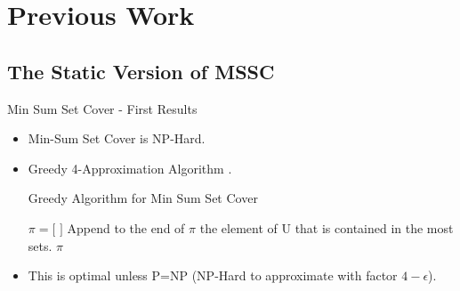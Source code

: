 \documentclass{beamer}
\begin{document}
\section{Previous Work}

\subsection{The Static Version of MSSC}

\begin{frame}{Min Sum Set Cover - First Results}
        \begin{itemize}
             \item Min-Sum Set Cover is NP-Hard.
             \item Greedy 4-Approximation Algorithm \cite{FLT02}.
                \begin{block}{Greedy Algorithm for Min Sum Set Cover}\label{alg:mssc}
                    \begin{algorithmic}[1]
                        \STATE $\pi = \text{[ ]}$
                            \STATE Append to the end of $\pi$ the element of U that is contained in the most sets.
                        \ENDWHILE
                        \RETURN $\pi$
                    \end{algorithmic}
                \end{block}
             \item This is optimal unless P=NP  (NP-Hard to approximate with factor $4-\epsilon$).
        \end{itemize}
\end{frame}
\end{document}
